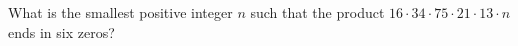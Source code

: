 What is the smallest positive integer $n$ such that the product $16\cdot34\cdot75\cdot21\cdot13\cdot n$ ends in six zeros?
